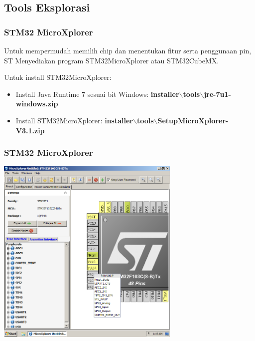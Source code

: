 \documentclass[table,dvipsnames]{beamer}
\begin{document}
	\subsection{Tools Eksplorasi}
	\begin{frame}
		\frametitle{STM32 MicroXplorer}
		\begin{exampleblock}{}
			Untuk mempermudah memilih chip dan menentukan fitur serta penggunaan pin,
			ST Menyediakan program STM32MicroXplorer atau STM32CubeMX.
		\end{exampleblock}

		\begin{exampleblock}{}
			Untuk install STM32MicroXplorer:
			\begin{itemize}
				\item Install Java Runtime 7 sesuai bit Windows:
				\textbf{installer$\backslash$tools$\backslash$jre-7u1-windows.zip}
				\item Install STM32MicroXplorer:
				\textbf{installer$\backslash$tools$\backslash$SetupMicroXplorer-V3.1.zip}
			\end{itemize}
		\end{exampleblock}
	\end{frame}

	\begin{frame}
		\frametitle{STM32 MicroXplorer}
		\begin{exampleblock}{}
			\begin{center}
				\includegraphics[width=250pt]{images/microxplorer}
			\end{center}
		\end{exampleblock}
	\end{frame}
\end{document}
